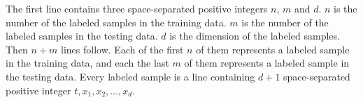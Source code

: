 The first line contains three space-separated positive integers 
$n$, $m$ and $d$.
$n$ is the number of the labeled samples in the training data. 
$m$ is the number of the labeled samples in the testing data.
$d$ is the dimension of the labeled samples.
Then $n+m$ lines follow. 
Each of the first $n$ of them represents a labeled sample in 
the training data, and each the last $m$ of them represents a 
labeled sample in the testing data.
Every labeled sample is a line containing $d+1$ space-separated positive
integer $t,x_1,x_2,\dots,x_d$. 
